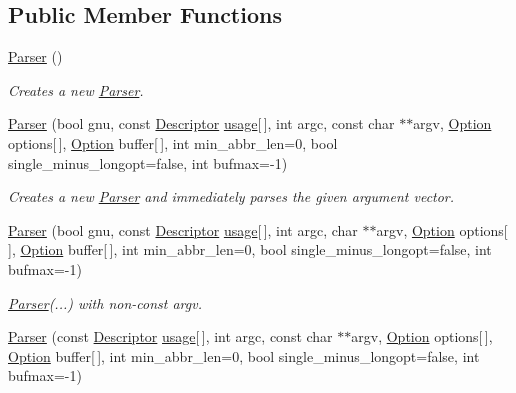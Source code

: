 \subsection*{Public Member Functions}
\begin{DoxyCompactItemize}
\item 
\hyperlink{class_option_parser_1_1_parser_a52e8caf4f946780051e093bad1c966e3}{Parser} ()
\begin{DoxyCompactList}\small\item\em Creates a new \hyperlink{class_option_parser_1_1_parser}{Parser}. \end{DoxyCompactList}\item 
\hyperlink{class_option_parser_1_1_parser_a7a82d034afe73e9954c47ab7363dfa5c}{Parser} (bool gnu, const \hyperlink{struct_option_parser_1_1_descriptor}{Descriptor} \hyperlink{_community_detection_8cpp_ae4e685e845abde182eb8fc1f87b756ae}{usage}\mbox{[}$\,$\mbox{]}, int argc, const char $\ast$$\ast$argv, \hyperlink{class_option_parser_1_1_option}{Option} options\mbox{[}$\,$\mbox{]}, \hyperlink{class_option_parser_1_1_option}{Option} buffer\mbox{[}$\,$\mbox{]}, int min\-\_\-abbr\-\_\-len=0, bool single\-\_\-minus\-\_\-longopt=false, int bufmax=-\/1)
\begin{DoxyCompactList}\small\item\em Creates a new \hyperlink{class_option_parser_1_1_parser}{Parser} and immediately parses the given argument vector. \end{DoxyCompactList}\item 
\hyperlink{class_option_parser_1_1_parser_ae4937e1f7695045b9a94f40ec858eda6}{Parser} (bool gnu, const \hyperlink{struct_option_parser_1_1_descriptor}{Descriptor} \hyperlink{_community_detection_8cpp_ae4e685e845abde182eb8fc1f87b756ae}{usage}\mbox{[}$\,$\mbox{]}, int argc, char $\ast$$\ast$argv, \hyperlink{class_option_parser_1_1_option}{Option} options\mbox{[}$\,$\mbox{]}, \hyperlink{class_option_parser_1_1_option}{Option} buffer\mbox{[}$\,$\mbox{]}, int min\-\_\-abbr\-\_\-len=0, bool single\-\_\-minus\-\_\-longopt=false, int bufmax=-\/1)
\begin{DoxyCompactList}\small\item\em \hyperlink{class_option_parser_1_1_parser}{Parser}(...) with non-\/const argv. \end{DoxyCompactList}\item 
\hyperlink{class_option_parser_1_1_parser_a7d01e47bdc5c96653b90ca06effbb4d0}{Parser} (const \hyperlink{struct_option_parser_1_1_descriptor}{Descriptor} \hyperlink{_community_detection_8cpp_ae4e685e845abde182eb8fc1f87b756ae}{usage}\mbox{[}$\,$\mbox{]}, int argc, const char $\ast$$\ast$argv, \hyperlink{class_option_parser_1_1_option}{Option} options\mbox{[}$\,$\mbox{]}, \hyperlink{class_option_parser_1_1_option}{Option} buffer\mbox{[}$\,$\mbox{]}, int min\-\_\-abbr\-\_\-len=0, bool single\-\_\-minus\-\_\-longopt=false, int bufmax=-\/1)
$$
\end{DoxyCompactItemize}

